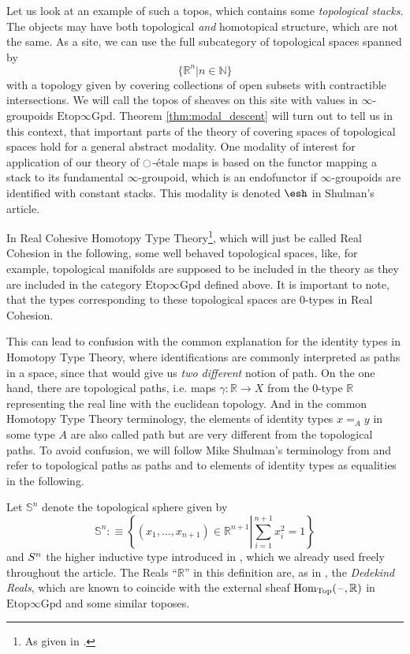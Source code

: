 \documentclass[9pt,twosided]{amsart}
\newcommand{\shape}{\ensuremath{\mathord{\raisebox{0.5pt}{\text{\rm\esh}}}}}
\newcommand{\bN}{\mathbb N}
\newcommand{\bR}{\mathbb R}
\newcommand{\bS}{\mathbb S}
\newcommand{\Spaces}{\ensuremath{\mathrm{Etop}\infty\mathrm{Gpd}}}
\begin{document}
Let us look at an example of such a topos, which contains some \emph{topological stacks}.
The objects may have both topological \emph{and} homotopical structure, which are not the same.
As a site, we can use the full subcategory of topological spaces spanned by
\[ \{ \bR^n \vert n\in\bN\}\]
with a topology given by covering collections of open subsets with contractible intersections.
We will call the topos of sheaves on this site with values in $\infty$-groupoids $\Spaces$. 
Theorem \ref{thm:modal_descent} will turn out to tell us in this context,
that important parts of the theory of covering spaces of topological spaces hold for a general abstract modality.
One modality of interest for application of our theory of ${\ocircle}$-étale maps is based on the functor mapping a stack to its fundamental $\infty$-groupoid,
which is an endofunctor if $\infty$-groupoids are identified with constant stacks. This modality is denoted $\shape$ in Shulman's article.

In Real Cohesive Homotopy Type Theory\footnote{As given in \cite{ShulmanRealCohesion}.},
which will just be called Real Cohesion in the following, 
some well behaved topological spaces, like, for example, topological manifolds
are supposed to be included in the theory as they are included in the category $\Spaces$ defined above.
It is important to note, that the types corresponding to these topological spaces
are $0$-types in Real Cohesion.

This can lead to confusion with the common explanation for the identity types in Homotopy Type Theory,
where identifications are commonly interpreted as paths in a space, since that would give us \emph{two different} notion of path. 
On the one hand, there are topological paths, i.e. maps $\gamma:\bR\to X$ from the $0$-type $\bR$ representing the real line with the euclidean topology.
And in the common Homotopy Type Theory terminology, the elements of identity types $x=_A y$ in some type $A$ are also called path but are very different from the topological paths. To avoid confusion, we will follow Mike Shulman's terminology from \cite{ShulmanRealCohesion} and refer to topological paths as paths and to elements of identity types as equalities in the following.

Let $\bS^{n}$ denote the topological sphere given by
\[ \bS^{n}:\equiv\left\{ (x_1,\dots,x_{n+1})\in\bR^{n+1}\left\vert \sum_{i=1}^{n+1}x_i^2=1\right.\right\}\]
and $S^{n}$ the higher inductive type introduced in \cite{UFP}, which we already used freely throughout the article.
The Reals ``$\bR$'' in this definition are, as in \cite{ShulmanRealCohesion}, the \emph{Dedekind Reals},
which are known to coincide with the external sheaf $\mathrm{Hom}_{\mathrm{Top}}(\blank,\bR)$ in $\Spaces$ and some similar toposes.
\end{document}
